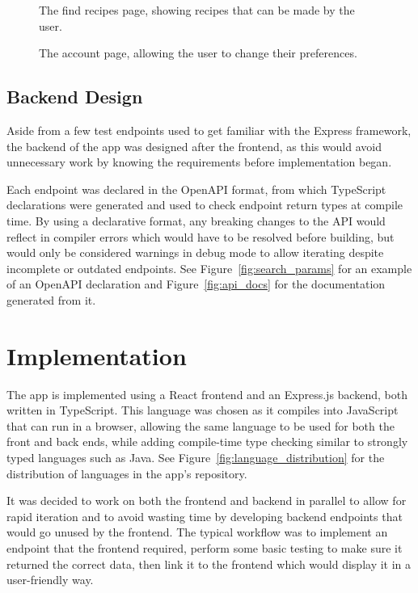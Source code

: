 \begin{figure}[ht]
  \centering
  
  \caption{\label{fig:proto_find_recipes}The find recipes page, showing recipes that can be made by the user. }
\end{figure}

\begin{figure}[ht]
  \centering
  
  \caption{\label{fig:proto_account}The account page, allowing the user to change their preferences.}
\end{figure}

\clearpage\subsection{Backend Design}

Aside from a few test endpoints used to get familiar with the Express framework, the backend of the \chef{} app was designed after the frontend,
as this would avoid unnecessary work by knowing the requirements before implementation began.

Each endpoint was declared in the OpenAPI format, from which TypeScript declarations were generated and used to check endpoint return types at compile time.
By using a declarative format, any breaking changes to the API would reflect in compiler errors which would have to be resolved before building, but would
only be considered warnings in debug mode to allow iterating despite incomplete or outdated endpoints. See Figure~\ref{fig:search_params} for an example of
an OpenAPI declaration and Figure~\ref{fig:api_docs} for the documentation generated from it.

\section{Implementation}

The \chef{} app is implemented using a React frontend and an Express.js backend, both written in TypeScript.
This language was chosen as it compiles into JavaScript that can run in a browser, allowing the same language to be used for both
the front and back ends, while adding compile-time type checking similar to strongly typed languages such as Java.
See Figure~\ref{fig:language_distribution} for the distribution of languages in the app's repository.

It was decided to work on both the frontend and backend in parallel to allow for rapid iteration and to avoid wasting time by
developing backend endpoints that would go unused by the frontend. The typical workflow was to implement an endpoint that
the frontend required, perform some basic testing to make sure it returned the correct data, then link it to the frontend which
would display it in a user-friendly way.

